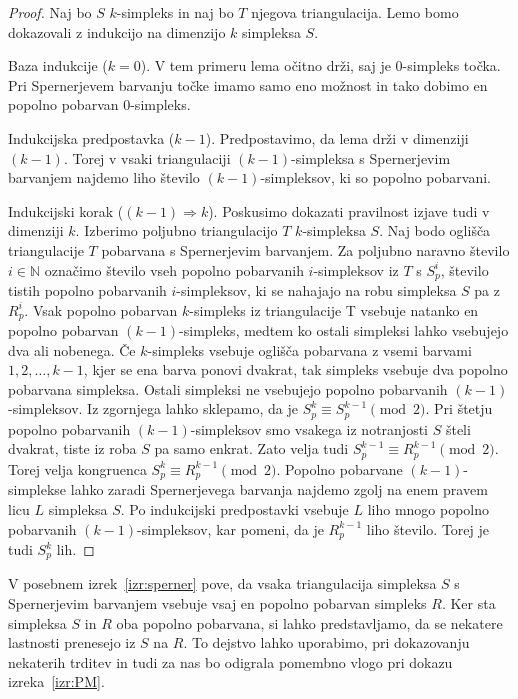 \documentclass[mat1]{fmfdelo}
\newcommand{\N}{\mathbb N}
\newcommand{\0}{\underline{0}}
\begin{document}
\begin{proof}
Naj bo $S$ $k$-simpleks in naj bo $T$ njegova triangulacija. Lemo bomo dokazovali z indukcijo na dimenzijo $k$ simpleksa $S$.

Baza indukcije ($k = 0$).
V tem primeru lema očitno drži, saj je $0$-simpleks točka. Pri Spernerjevem barvanju točke imamo samo eno možnost in tako dobimo en popolno pobarvan $0$-simpleks.

Indukcijska predpostavka ($k - 1$).
Predpostavimo, da lema drži v dimenziji $(k - 1)$. Torej v vsaki triangulaciji $(k - 1)$-simpleksa s Spernerjevim barvanjem najdemo liho število $(k - 1)$-simpleksov, ki so popolno pobarvani.

Indukcijski korak ($(k - 1) \Longrightarrow k$).
Poskusimo dokazati pravilnost izjave tudi v dimenziji $k$. Izberimo poljubno triangulacijo $T$ $k$-simpleksa $S$. Naj bodo oglišča triangulacije $T$ pobarvana s Spernerjevim barvanjem. Za poljubno naravno število $i \in \N$ označimo število vseh popolno pobarvanih $i$-simpleksov iz $T$ s $S_p^i$, število tistih popolno pobarvanih $i$-simpleksov, ki se nahajajo na robu simpleksa $S$ pa z $R_p^i$. Vsak popolno pobarvan $k$-simpleks iz triangulacije T vsebuje natanko en popolno pobarvan $(k-1)$-simpleks, medtem ko ostali simpleksi lahko vsebujejo dva ali nobenega. Če $k$-simpleks vsebuje oglišča pobarvana z vsemi barvami $1, 2, \dots, k-1$, kjer se ena barva ponovi dvakrat, tak simpleks vsebuje dva popolno pobarvana simpleksa. Ostali simpleksi ne vsebujejo popolno pobarvanih $(k - 1)$-simpleksov. Iz zgornjega lahko sklepamo, da je $S_p^k \equiv S_p^{k-1} \pmod 2$. Pri štetju popolno pobarvanih $(k - 1)$-simpleksov smo vsakega iz notranjosti $S$ šteli dvakrat, tiste iz roba $S$ pa samo enkrat. Zato velja tudi $S_p^{k-1} \equiv R_p^{k - 1} \pmod 2$. Torej velja kongruenca $S_p^k \equiv R_p^{k - 1} \pmod 2$. Popolno pobarvane $(k - 1)$-simplekse lahko zaradi Spernerjevega barvanja najdemo zgolj na enem pravem licu $L$ simpleksa $S$. Po indukcijski predpostavki vsebuje $L$ liho mnogo popolno pobarvanih $(k - 1)$-simpleksov, kar pomeni, da je $R_p^{k - 1}$ liho število. Torej je tudi  $S_p^k$ lih.
\end{proof}
V posebnem izrek~\ref{izr:sperner} pove, da vsaka triangulacija simpleksa $S$ s Spernerjevim barvanjem vsebuje vsaj en popolno pobarvan simpleks $R$. Ker sta simpleksa $S$ in $R$ oba popolno pobarvana, si lahko predstavljamo, da se nekatere lastnosti prenesejo iz $S$ na $R$. To dejstvo lahko uporabimo, pri dokazovanju nekaterih trditev in tudi za nas bo odigrala pomembno vlogo pri dokazu izreka~\ref{izr:PM}. 
\end{document}
